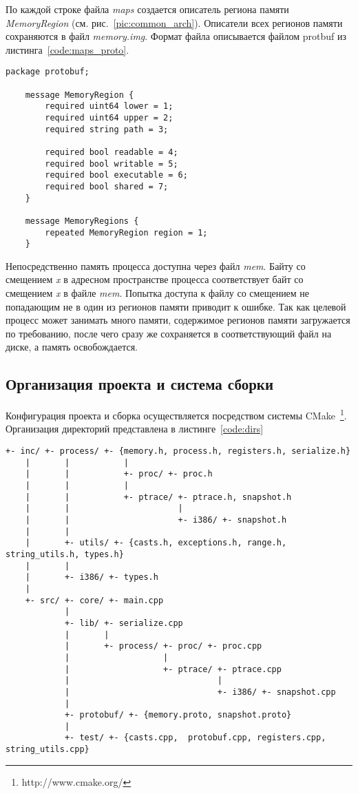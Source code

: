 По каждой строке файла \textit{maps} создается описатель региона памяти \textit{MemoryRegion} (см. рис.~\ref{pic:common_arch}). Описатели всех регионов памяти сохраняются в файл \textit{memory.img}. Формат файла описывается файлом protbuf из листинга~\ref{code:maps_proto}.

\begin{lstlisting}[caption=Формат сохранения описателей регионов памяти, label=code:maps_proto]
    package protobuf;

    message MemoryRegion {
        required uint64 lower = 1;
        required uint64 upper = 2;
        required string path = 3;

        required bool readable = 4;
        required bool writable = 5;
        required bool executable = 6;
        required bool shared = 7;
    }

    message MemoryRegions {
        repeated MemoryRegion region = 1;
    }
\end{lstlisting}

Непосредственно память процесса доступна через файл \textit{mem}. Байту со смещением \textit{x} в адресном пространстве процесса соответствует байт со смещением \textit{x} в файле \textit{mem}. Попытка доступа к файлу со смещением не попадающим не в один из регионов памяти приводит к ошибке. Так как целевой процесс может занимать много памяти, содержимое регионов памяти загружается по требованию, после чего сразу же сохраняется в соответствующий файл на диске, а память освобождается.

\newpage
\subsection{Организация проекта и система сборки}

Конфигурация проекта и сборка осуществляется посредством системы CMake~\footnote{http://www.cmake.org/}. Организация директорий представлена в листинге~\ref{code:dirs}

\begin{lstlisting}[caption=Организация каталогов, label=code:dirs]
    +- inc/ +- process/ +- {memory.h, process.h, registers.h, serialize.h}
    |       |           |
    |       |           +- proc/ +- proc.h
    |       |           |
    |       |           +- ptrace/ +- ptrace.h, snapshot.h
    |       |                      |
    |       |                      +- i386/ +- snapshot.h
    |       |
    |       +- utils/ +- {casts.h, exceptions.h, range.h, string_utils.h, types.h}
    |       |
    |       +- i386/ +- types.h
    |
    +- src/ +- core/ +- main.cpp
            |
            +- lib/ +- serialize.cpp
            |       |
            |       +- process/ +- proc/ +- proc.cpp
            |                   |
            |                   +- ptrace/ +- ptrace.cpp
            |                              |
            |                              +- i386/ +- snapshot.cpp
            |
            +- protobuf/ +- {memory.proto, snapshot.proto}
            |
            +- test/ +- {casts.cpp,  protobuf.cpp, registers.cpp, string_utils.cpp}
\end{lstlisting}

